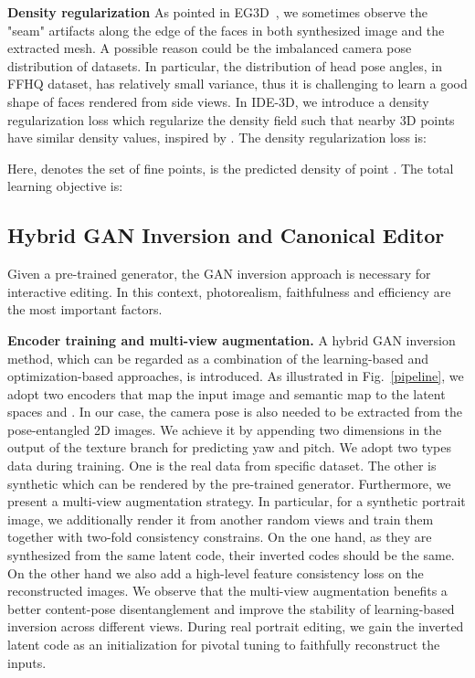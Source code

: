 \documentclass[acmtog]{acmart}
\begin{document}
\noindent \textbf{Density regularization} As pointed in EG3D~\cite{eg3d}, we sometimes observe the "seam" artifacts along the edge of the faces in both synthesized image and the extracted mesh. A possible reason could be the imbalanced camera pose distribution of datasets. In particular, the distribution of head pose angles, in FFHQ dataset, has relatively small variance, thus it is challenging to learn a good shape of faces rendered from side views. In IDE-3D, we introduce a density regularization loss which regularize the density field such that nearby 3D points have similar density values, inspired by \cite{eg3d, oechsle2021unisurf, chen2021snarf}. The density regularization loss is:



\noindent Here,  denotes the set of fine points,  is the predicted density of point . The total learning objective is:



\subsection{Hybrid GAN Inversion and Canonical Editor}
\label{sec:3.2}



Given a pre-trained generator, the GAN inversion approach is necessary for interactive editing. In this context, photorealism, faithfulness and efficiency are the most important factors.

\noindent \textbf{Encoder training and multi-view augmentation.}
A hybrid GAN inversion method, which can be regarded as a combination of the learning-based and optimization-based approaches, is introduced. As illustrated in Fig.~\ref{pipeline}, we adopt two encoders that map the input image and semantic map to the latent spaces  and . In our case, the camera pose is also needed to be extracted from the pose-entangled 2D images. We achieve it by appending two dimensions in the output of the texture branch for predicting yaw and pitch. We adopt two types data during training. One is the real data from specific dataset. The other is synthetic which can be rendered by the pre-trained generator. Furthermore, we present a multi-view augmentation strategy. In particular, for a synthetic portrait image, we additionally render it from another  random views and train them together with two-fold consistency constrains. On the one hand, as they are synthesized from the same latent code, their inverted codes should be the same. On the other hand we also add a high-level feature consistency loss on the reconstructed images. We observe that the multi-view augmentation benefits a better content-pose disentanglement and improve the stability of learning-based inversion across different views. During real portrait editing, we gain the inverted latent code as an initialization for pivotal tuning \cite{roich2021pivotal} to faithfully reconstruct the inputs.
\end{document}
